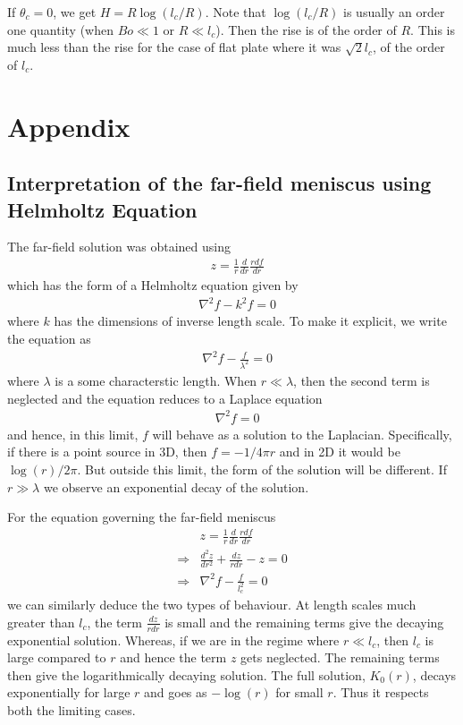 \documentclass[11pt,a4paper]{article}
\newcommand{\1}{\vect{1}}
\newcommand{\grad}{\nabla}
\begin{document}
If $\theta_c = 0$, we get $H = R\log(l_c/R)$. Note that $\log(l_c/R)$ is usually an order one quantity (when $Bo \ll 1$ or $R \ll l_c$). Then the rise is of the order of $R$. This is much less than the rise for the case of flat plate where it was $\sqrt 2 l_c$, of the order of $l_c$.
\section{Appendix}

\subsection{Interpretation of the far-field meniscus using Helmholtz Equation}
The far-field solution was obtained using
\begin{align*}
&z = \frac 1 r\frac{d}{dr}\frac{rdf}{dr}
\end{align*}
which has the form of a Helmholtz equation given by
\begin{align*}
&\grad^2f-k^2f=0
\end{align*}
where $k$ has the dimensions of inverse length scale. To make it explicit, we write the equation as
\begin{align*}
&\grad^2f-\frac{f}{\lambda^2}=0
\end{align*}
where $\lambda$ is a some characterstic length. When $r \ll \lambda$, then the second term is neglected and the equation reduces to a Laplace equation
\begin{align*}
&\grad^2f=0
\end{align*}
and hence, in this limit, $f$ will behave as a solution to the Laplacian. Specifically, if there is a point source in 3D, then $f = -1/4\pi r$ and in 2D it would be $\log(r)/2\pi$. But outside this limit, the form of the solution will be different. If $r \gg \lambda$ we observe an exponential decay of the solution. 

For the equation governing the far-field meniscus 
\begin{align*}
&z = \frac 1 r\frac{d}{dr}\frac{rdf}{dr}\\
\Rightarrow& \frac{d^2z}{dr^2} +\frac{dz}{rdr} - z = 0 \tag{using $z=f(r)$}\\
\Rightarrow& \grad^2f - \frac{f}{l_c^2} = 0 \tag{dimensionalizing}
\end{align*}
we can similarly deduce the two types of behaviour. At length scales much greater than $l_c$, the term $\frac{dz}{rdr}$ is small and the remaining terms give the decaying exponential solution. Whereas, if we are in the regime where $r \ll l_c$, then $l_c$ is large compared to $r$ and hence the term $z$ gets neglected. The remaining terms then give the logarithmically decaying solution. The full solution, $K_0(r)$, decays exponentially for large $r$ and goes as $-\log(r)$ for small $r$. Thus it respects both the limiting cases.
\end{document}
